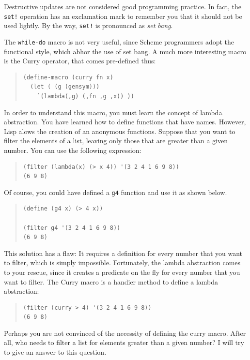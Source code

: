 \documentclass[a4paper,12pt]{book}
\begin{document}
Destructive updates are not
considered good programming practice.
In fact, the \verb|set!| operation has
an exclamation mark to remember you
that it should not be used lightly.
By the way, \verb|set!|
is pronounced as {\em set bang}.

The \verb|while-do| macro is not very useful,
since Scheme programmers adopt the functional
style, which abhor the use of set bang.
A much more interesting macro is the
Curry operator, that comes pre-defined thus:
\begin{quote}\label{page:lambda2}
\begin{verbatim}
(define-macro (curry fn x)
  (let ( (g (gensym)))
    `(lambda(,g) (,fn ,g ,x)) ))
\end{verbatim}
\end{quote}
In order to understand this macro, you
must learn the concept of lambda abstraction.
You have learned how to define functions
that have names. However,
Lisp alows the creation of
an anonymous functions.
Suppose that you want to filter the
elements of a list, leaving only those
that are greater than a given number.
You can use the following expression:
\begin{quote}
\begin{verbatim}
(filter (lambda(x) (> x 4)) '(3 2 4 1 6 9 8))
(6 9 8)
\end{verbatim}
\end{quote}
Of course, you could have defined a 
\verb|g4| function and use it as shown below.
\begin{quote}
\begin{verbatim}
(define (g4 x) (> 4 x))

(filter g4 '(3 2 4 1 6 9 8))
(6 9 8)
\end{verbatim}
\end{quote}
This solution has a flaw: It requires a
definition for every number that you
want to filter, which is simply impossible.
Fortunately, the lambda abstraction comes
to your rescue, since it 
creates a predicate on the fly for every
number that you want to filter. The Curry
macro is a handier method to define a lambda
abstraction:
\begin{quote}
\begin{verbatim}
(filter (curry > 4) '(3 2 4 1 6 9 8))
(6 9 8)
\end{verbatim}
\end{quote}

Perhaps you are not convinced of the
necessity of defining the curry macro.
After all, who  needs to filter a list
for elements greater than a given number?
I will try to give an answer to this
question.
\end{document}
